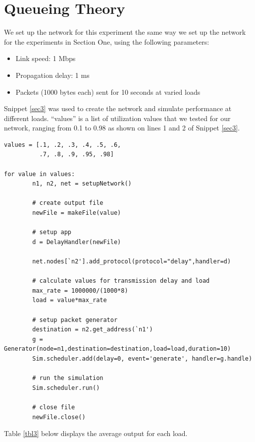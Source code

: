 \documentclass[11pt]{article}
\begin{document}
\section{Queueing Theory}

We set up the network for this experiment the same way we set up the network for the experiments in Section One, using the following parameters:

\begin{itemize}
\item Link speed: 1 Mbps
\item Propagation delay: 1 ms
\item Packets (1000 bytes each) sent for 10 seconds at varied loads 
\end{itemize}

\medskip

Snippet \ref{sec3} was used to create the network and simulate performance at different loads. ``values'' is a list of utilization values that we tested for our network, ranging from 0.1 to 0.98 as shown on lines 1 and 2 of Snippet \ref{sec3}.

\medskip

\begin{lstlisting}[caption={Network 3},label=sec3]
values = [.1, .2, .3, .4, .5, .6,
          .7, .8, .9, .95, .98]

for value in values:
        n1, n2, net = setupNetwork()

        # create output file
        newFile = makeFile(value)

        # setup app
        d = DelayHandler(newFile)

        net.nodes[`n2'].add_protocol(protocol="delay",handler=d)

        # calculate values for transmission delay and load
        max_rate = 1000000/(1000*8)
        load = value*max_rate

        # setup packet generator
        destination = n2.get_address(`n1')
        g = Generator(node=n1,destination=destination,load=load,duration=10)
        Sim.scheduler.add(delay=0, event='generate', handler=g.handle)
        
        # run the simulation
        Sim.scheduler.run()

        # close file
        newFile.close()
\end{lstlisting}

Table \ref{tbl3} below displays the average output for each load.
\end{document}
